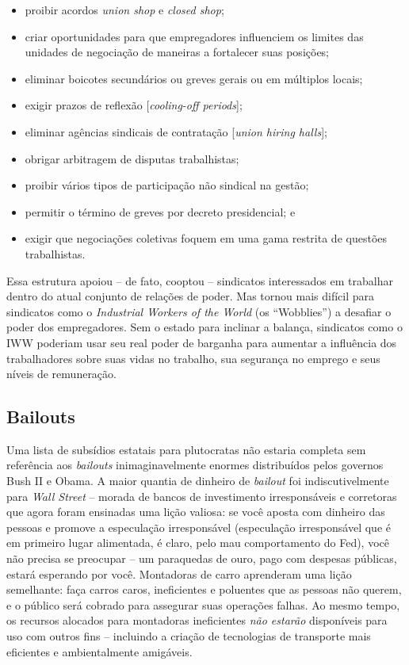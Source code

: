 \begin{itemize}
\item proibir acordos \emph{union shop} e \emph{closed shop};
\item criar oportunidades para que empregadores influenciem os limites das unidades de negociação de maneiras a fortalecer suas posições;
\item eliminar boicotes secundários ou greves gerais ou em múltiplos locais;
\item exigir prazos de reflexão [\emph{cooling-off periods}];
\item eliminar agências sindicais de contratação [\emph{union hiring halls}];
\item obrigar arbitragem de disputas trabalhistas;
\item proibir vários tipos de participação não sindical na gestão;
\item permitir o término de greves por decreto presidencial; e
\item exigir que negociações coletivas foquem em uma gama restrita de questões trabalhistas.
\end{itemize}

Essa estrutura apoiou -- de fato, cooptou -- sindicatos interessados em trabalhar dentro do atual conjunto de relações de poder. Mas tornou mais difícil para sindicatos como o \emph{Industrial Workers of the World} (os ``Wobblies'') a desafiar o poder dos empregadores. Sem o estado para inclinar a balança, sindicatos como o IWW poderiam usar seu real poder de barganha para aumentar a influência dos trabalhadores sobre suas vidas no trabalho, sua segurança no emprego e seus níveis de remuneração.

\subsection*{Bailouts}

Uma lista de subsídios estatais para plutocratas não estaria completa sem referência aos \emph{bailouts} inimaginavelmente enormes distribuídos pelos governos Bush II e Obama. A maior quantia de dinheiro de \emph{bailout} foi indiscutivelmente para \emph{Wall Street} -- morada de bancos de investimento irresponsáveis e corretoras que agora foram ensinadas uma lição valiosa: se você aposta com dinheiro das pessoas e promove a especulação irresponsável (especulação irresponsável que é em primeiro lugar alimentada, é claro, pelo mau comportamento do Fed), você não precisa se preocupar -- um paraquedas de ouro, pago com despesas públicas, estará esperando por você. Montadoras de carro aprenderam uma lição semelhante: faça carros caros, ineficientes e poluentes que as pessoas não querem, e o público será cobrado para assegurar suas operações falhas. Ao mesmo tempo, os recursos alocados para montadoras ineficientes \emph{não estarão} disponíveis para uso com outros fins -- incluindo a criação de tecnologias de transporte mais eficientes e ambientalmente amigáveis.

